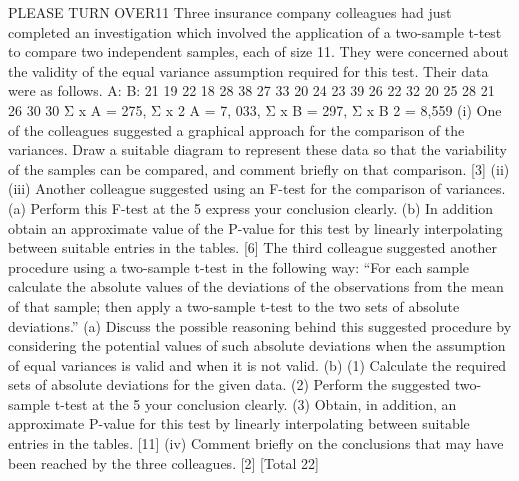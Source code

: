\documentclass[a4paper,12pt]{article}
\begin{document}
\begin{enumerate}
PLEASE TURN OVER11
Three insurance company colleagues had just completed an investigation which
involved the application of a two-sample t-test to compare two independent samples,
each of size 11. They were concerned about the validity of the equal variance
assumption required for this test. Their data were as follows.
A:
B:
21
19
22
18
28
38
27
33
20
24
23
39
26
22
32
20
25
28
21
26
30
30
Σ x A = 275, Σ x 2 A = 7, 033, Σ x B = 297, Σ x B 2 = 8,559
(i)
One of the colleagues suggested a graphical approach for the comparison of
the variances.
Draw a suitable diagram to represent these data so that the variability of the
samples can be compared, and comment briefly on that comparison.
[3]
(ii)
(iii)
Another colleague suggested using an F-test for the comparison of variances.
(a) Perform this F-test at the 5%
express your conclusion clearly.
(b) In addition obtain an approximate value of the P-value for this test by
linearly interpolating between suitable entries in the tables.
[6]
The third colleague suggested another procedure using a two-sample t-test in
the following way:
“For each sample calculate the absolute values of the
deviations of the observations from the mean of that sample;
then apply a two-sample t-test to the two sets of absolute
deviations.”
(a) Discuss the possible reasoning behind this suggested procedure by
considering the potential values of such absolute deviations when the
assumption of equal variances is valid and when it is not valid.
(b) (1) Calculate the required sets of absolute deviations for the given
data.
(2) Perform the suggested two-sample t-test at the 5%
your conclusion clearly.
(3) Obtain, in addition, an approximate P-value for this test by
linearly interpolating between suitable entries in the tables.
[11]
(iv)
Comment briefly on the conclusions that may have been reached by the three
colleagues.
[2]
[Total 22]



\end{enumerate}
\end{document}
